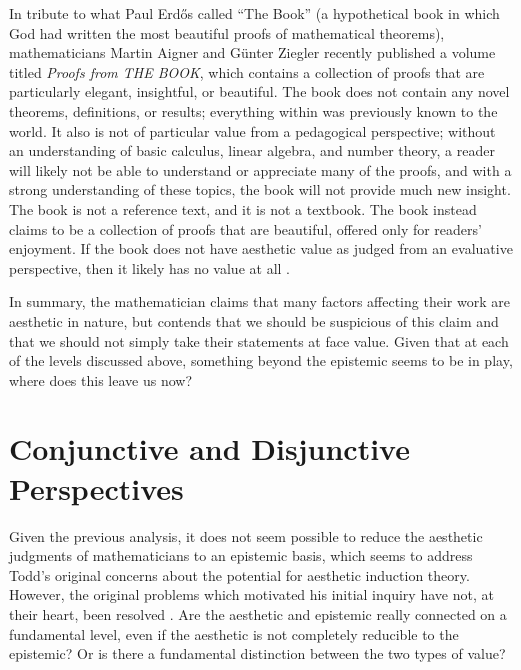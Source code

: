 \documentclass[a4paper,man,natbib]{apa6}
\begin{document}
In tribute to what Paul Erdős called ``The Book'' (a hypothetical book in which God had written the most beautiful proofs
of mathematical theorems), mathematicians Martin Aigner and Günter Ziegler recently published a volume titled \textit{Proofs 
from THE BOOK},
which contains a collection of proofs that are particularly elegant, insightful, or beautiful. The book does not contain
any novel theorems, definitions, or results; everything within was previously known to the world. It also is not of 
particular value
from a pedagogical perspective; without an understanding of basic calculus, linear algebra, and number theory, a reader 
will likely not be able to understand or appreciate many of the proofs, and with a strong understanding of these topics,
the book will not provide much new insight. The book is not a reference text, and it is not a textbook. The book instead
claims to be a collection of proofs that are beautiful, offered only for readers' enjoyment. If the book does not
have aesthetic value as judged from an evaluative perspective, then it likely has no value at all \citep{aigner1999proofs}.

In summary, the mathematician claims that many factors affecting their work are aesthetic in nature, but \cite{todd_unmasking_2008} 
contends that we should be suspicious of this claim and that we should not simply take their statements at face value. 
Given that at each of the levels discussed above, something beyond the epistemic seems to be in play, where does this 
leave us now?

\section{Conjunctive and Disjunctive Perspectives}

Given the previous analysis, it does not seem possible to reduce the aesthetic judgments of mathematicians to
an epistemic basis, which seems to address Todd's original concerns about the potential for aesthetic induction
theory. However, the original problems which motivated his initial inquiry have not, at their heart, been 
resolved \citep{todd_unmasking_2008}. Are the aesthetic and epistemic really
connected on a fundamental level, even if the aesthetic is not completely reducible to the epistemic? Or is there
a fundamental distinction between the two types of value?
\end{document}
